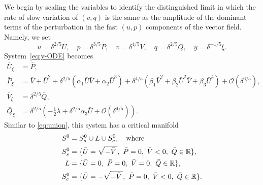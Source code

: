 \documentclass[11pt]{article}
\numberwithin{equation}{section}
\begin{document}
We begin by scaling the variables to identify the distinguished limit in which the rate of slow variation of $(v,q)$ is the same as the amplitude of the dominant terms of the perturbation in the fast $(u,p)$ components of the vector field.
Namely, we set
\begin{equation}\label{eq:distinguishedlimit}
u = \delta^{2/5} {\bar U}, \quad
p = \delta^{3/5} {\bar P}, \quad 
v = \delta^{4/5} {\bar V}, \quad
q = \delta^{2/5} {\bar Q}, \quad 
y = \delta^{-1/5} \xi.
\end{equation}
System~\eqref{eq:y-ODE} becomes
\begin{equation}\label{eq:72}
\begin{split}
    {\bar U}_\xi &= {\bar P}, \\
    {\bar P}_\xi &= {\bar V} + {\bar U}^2 
                    + \delta^{2/5} \left( \alpha_1 {\bar U}{\bar V} + \alpha_2 {\bar U}^3 \right)
                    + \delta^{4/5}\left( \beta_1 {\bar V}^2 + \beta_2 {\bar U}^2 {\bar V} + \beta_3 {\bar U}^4 \right) 
                    + \mathcal{O}(\delta^{6/5}), \\
    {\bar V}_\xi &= \delta^{2/5} {\bar Q}, \\      
    {\bar Q}_\xi &= \delta^{2/5} \left(-\tfrac{1}{2} \lambda + \delta^{2/5}\alpha_3 {\bar U} + \mathcal{O}(\delta^{4/5}) \right).
\end{split}
\end{equation}
Similar to \eqref{eq:union}, this system has a critical manifold
\begin{equation*}
\begin{split} 
    S^0 &= S_s^0 \cup L \cup S_c^0, \quad {\rm where} \\
    S_s^0 &= \{ \bar{U}=\sqrt{-\bar{V} \, }, \, \, \bar{P}=0,  \, \, \bar{V}<0, \, \, \bar{Q} \in \mathbb{R} \}, \\ 
    L &= \{\bar{U}=0, \, \, \bar{P}=0, \, \,\bar{V}=0, \, \, \bar{Q} \in \mathbb{R} \}, \\
    S_c^0 &= \{\bar{U} = - \sqrt{-\bar{V} \, }, \, \,  \bar{P}=0,\,\, \bar{V}<0, \, \, \bar{Q} \in \mathbb{R} \}.
    \end{split} 
\end{equation*}
\end{document}

